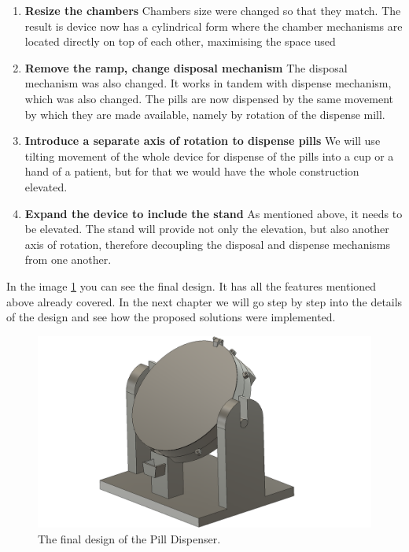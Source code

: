 \begin{enumerate}
	\item{\textbf{Resize the chambers}} Chambers size were changed so that they match. The result is device now has a cylindrical form where the chamber mechanisms are located directly on top of each other, maximising the space used
	\item{\textbf{Remove the ramp, change disposal mechanism}} The disposal mechanism was also changed. It works in tandem with dispense mechanism, which was also changed. The pills are now dispensed by the same movement by which they are made available, namely by rotation of the dispense mill. 
	\item{\textbf{Introduce a separate axis of rotation to dispense pills}} We will use tilting movement of the whole device for dispense of the pills into a cup or a hand of a patient, but for that we would have the whole construction elevated.
	\item{\textbf{Expand the device to include the stand}} As mentioned above, it needs to be elevated. The stand will provide not only the elevation, but also another axis of rotation, therefore decoupling the disposal and dispense mechanisms from one another.
\end{enumerate}
In the image \ref{fig:screenshot5} you can see the final design. It has all the features mentioned above already covered. In the next chapter we will go step by step into the details of the design and see how the proposed solutions were implemented.
\begin{figure}[]
	\centering
	\includegraphics[width=0.6\linewidth]{Figures/Screenshot_5}
	\caption[Final result]{The final design of the Pill Dispenser.}
	\label{fig:screenshot5}
\end{figure}


